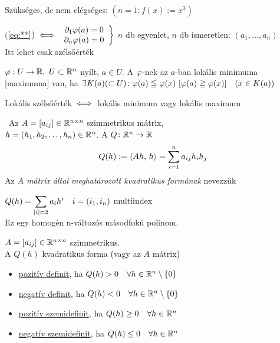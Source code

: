 \begin{Megj}
\item Szükséges, de nem elégséges: $(n=1\colon f(x) := x^3)$
\item $($\ref{eq:**}$)\iff \left.\begin{array}{c}\partial_1\varphi(a)=0\\\partial_n\varphi(a)=0\end{array} \right\}$
  $n$ db egyenlet, $n$ db ismeretlen: $(a_1,\dotsc,a_n)$\\
  Itt lehet csak szélsőérték
\end{Megj}

\begin{de}
  $\varphi: U\to\mathbb{R},\ U\subset \mathbb{R}^n$ nyílt, $a\in U$. A $\varphi$-nek az $a$-ban lokális minimuma [maximuma] van, ha $\exists
  K(a) (\subset U)\colon \varphi(a) \leqq \varphi(x) \ [\varphi(a) \geqq \varphi(x)]  \quad(x\in K(a))$
\end{de}
\begin{megj}
  Lokális szélsőérték $\iff$ lokális minimum vagy lokális maximum
\end{megj}

\begin{de}\ 
  Az $A=[a_{ij}]\in\mathbb{R}^{n\times n}$ szimmetrikus mátrix,\\ $h=(h_1,h_2,\dotsc,h_n)\in\mathbb{R}^n$. A  $Q\colon \mathbb{R}^n\to\mathbb{R}$
  \[ Q(h) := \langle Ah,\,h\rangle = \sum_{i=1}^n a_{ij}h_ih_j\]
  Az \emph{$A$ mátrix által meghatározott kvadratikus formának} nevezzük 
\end{de}

\begin{megj}
  $\displaystyle Q(h) = \sum_{|i|=2}a_ih^i\quad i=(i_1,i_n)$ multiindex\\
  Ez egy homogén n-változós másodfokú polinom.
\end{megj}
\begin{de}
  $A=[a_{ij}]\in\mathbb{R}^{n\times n}$ szimmetrikus.\\
  A $Q(h)$ kvadratikus forma (vagy az $A$ mátrix)
  \begin{itemize}[\quad]
  \item \underline{pozitív definit}, ha $Q(h)>0\quad\forall h\in\mathbb{R}^n\setminus\{0\}$
  \item \underline{negatív definit}, ha $Q(h)<0\quad\forall h\in\mathbb{R}^n\setminus\{0\}$
  \item \underline{pozitív szemidefinit}, ha $Q(h)\geq0\quad\forall h\in\mathbb{R}^n$
  \item \underline{negatív szemidefinit}, ha $Q(h)\leq0\quad\forall h\in\mathbb{R}^n$
  \end{itemize}
\end{de}


